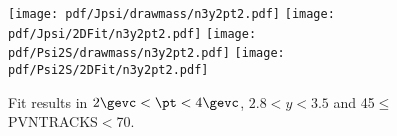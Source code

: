 \begin{figure}[H]
\begin{center}
\texttt{[image: pdf/Jpsi/drawmass/n3y2pt2.pdf]}
\texttt{[image: pdf/Jpsi/2DFit/n3y2pt2.pdf]}
\vspace*{-0.5cm}
\texttt{[image: pdf/Psi2S/drawmass/n3y2pt2.pdf]}
\texttt{[image: pdf/Psi2S/2DFit/n3y2pt2.pdf]}
\vspace*{-0.5cm}
\end{center}
\caption{Fit results in $2\gevc<\pt<4\gevc$, $2.8<y<3.5$ and 45$\leq$PVNTRACKS$<$70.}
\label{Fitn3y2pt2}
\end{figure}
